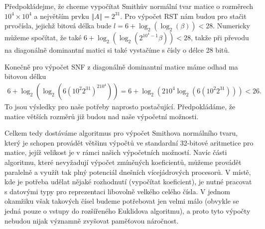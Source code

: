 \begin{pri}
Předpokládejme, že chceme vypočítat Smithův normální tvar matice o rozměrech
$ 10^4 \times 10^4 $ a největším prvku $ \Vert A \Vert = 2^{31} $. Pro výpočet 
RST nám budou pro stačit prvočísla, jejichž bitová délka bude 
$ l = 6 + \log_2(\log_2(\beta)) < 28 $. Numericky můžeme spočítat, že také
$ 6 + \log_2(\log_2(2^{10^4 - 1} \beta)) < 28 $, takže při převodu na diagonálně
dominantní matici si také vystačíme s čísly o délce 28 bitů.

Konečně pro výpočet SNF z diagonálně dominantní matice máme odhad ma bitovou 
délku 
\begin{align*}
    6 + \log_2(\log_2(6 (10^{2} 2^31)^{2 10^4})) 
        = 6 + \log_2(2 10^4 \log_2(6 (10^{2} 2^31))) 
        < 26.
\end{align*}
To jsou výsledky pro naše potřeby naprosto postačující. Předpokládáme, 
že matice větších rozměrů již budou nad naše výpočetní možnosti.
\end{pri}

Celkem tedy dostáváme algoritmus pro výpočet Smithova normálního tvaru, který
je schopen provádět většinu výpočtů ve standardní 32-bitové aritmetice pro 
matice, jejíž velikost je v rámci našich výpočetních možností. Navíc části
algoritmu, které nevyžadují výpočet zmíněných koeficientů, můžeme provádět
paralelně a využít tak plný potenciál dnešních vícejádrových procesorů.
V místě, kde je potřeba udělat nějaké rozhodnutí (vypočítat koeficient),
je nutné pracovat s datovými typy pro reprezentaci libovolně velkého celého
čísla. V jednom okamžiku však takových čísel budeme potřebovat jen velmi málo
(obvykle se jedná pouze o vstupy do rozšířeného Euklidova algoritmu), a proto
tyto výpočty nebudou nijak významně zvyšovat paměťovou náročnost.
